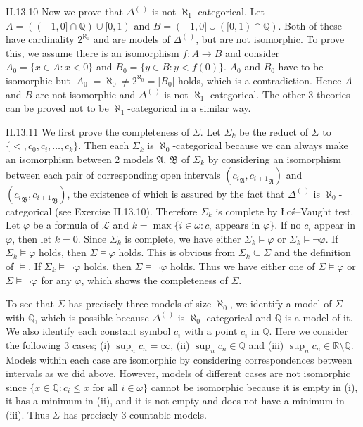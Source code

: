 \documentclass[12pt]{article}
\begin{document}
\begin{customthm}{II.13.10}
  Now we prove that $\Delta^{(~)}$ is not $\aleph_1$-categorical. Let $A=((-1,0]\cap\mathbb{Q})\cup[0,1)$ and $B=(-1,0]\cup([0,1)\cap\mathbb{Q})$. Both of these have cardinality $2^{\aleph_0}$ and are models of $\Delta^{(~)}$, but are not isomorphic. To prove this, we assume there is an isomorphism $f:A\rightarrow B$ and consider $A_0=\{x\in A:x<0\}$ and $B_0=\{y\in B:y<f(0)\}$. $A_0$ and $B_0$ have to be isomorphic but $|A_0|=\aleph_0\neq2^{\aleph_0}=|B_0|$ holds, which is a contradiction. Hence $A$ and $B$ are not isomorphic and $\Delta^{(~)}$ is not $\aleph_1$-categorical. The other 3 theories can be proved not to be $\aleph_1$-categorical in a similar way.
\end{customthm}

\begin{customthm}{II.13.11}
  We first prove the completeness of $\Sigma$. Let $\Sigma_k$ be the reduct of $\Sigma$ to  $\{<,c_0,c_i,\ldots,c_k\}$. Then each $\Sigma_k$ is $\aleph_0$-categorical because we can always make an isomorphism between 2 models $\mathfrak{A}$, $\mathfrak{B}$ of $\Sigma_k$ by considering an isomorphism between each pair of corresponding open intervals $({c_{i}}_\mathfrak{A},{c_{i+1}}_\mathfrak{A})$ and $({c_{i}}_\mathfrak{B},{c_{i+1}}_\mathfrak{B})$, the existence of which is assured by the fact that $\Delta^{(~)}$ is $\aleph_0$-categorical (see Exercise II.13.10). Therefore $\Sigma_k$ is complete by Łoś–Vaught test. Let $\varphi$ be a formula of $\mathcal{L}$ and $k=\max\{i\in\omega:c_i \text{ appears in } \varphi\}$. If no $c_i$ appear in $\varphi$, then let $k=0$. Since $\Sigma_k$ is complete, we have either $\Sigma_k\models\varphi$ or $\Sigma_k\models\neg\varphi$. If $\Sigma_k\models\varphi$ holds, then $\Sigma\models\varphi$ holds. This is obvious from $\Sigma_k\subseteq\Sigma$ and the definition of $\models$. If $\Sigma_k\models\neg\varphi$ holds, then $\Sigma\models\neg\varphi$ holds. Thus we have either one of $\Sigma\models\varphi$ or $\Sigma\models\neg\varphi$ for any $\varphi$, which shows the completeness of $\Sigma$.

  To see that $\Sigma$ has precisely three models of size $\aleph_0$, we identify a model of $\Sigma$ with $\mathbb{Q}$, which is possible because $\Delta^{(~)}$ is $\aleph_0$-categorical and $\mathbb{Q}$ is a model of it. We also identify each constant symbol $c_i$ with a point $c_i$ in $\mathbb{Q}$. Here we consider the following 3 cases; (i) $\sup_n c_n=\infty$, (ii) $\sup_n c_n\in\mathbb{Q}$ and (iii) $\sup_n c_n\in\mathbb{R}\setminus\mathbb{Q}$. Models within each case are isomorphic by considering correspondences between intervals as we did above. However, models of different cases are not isomorphic since $\{x\in\mathbb{Q}:c_i\leq x \text{ for all } i\in\omega\}$ cannot be isomorphic because it is empty in (i), it has a minimum in (ii), and it is not empty and does not have a minimum in (iii). Thus $\Sigma$ has precisely 3 countable models.
\end{customthm}
\end{document}
